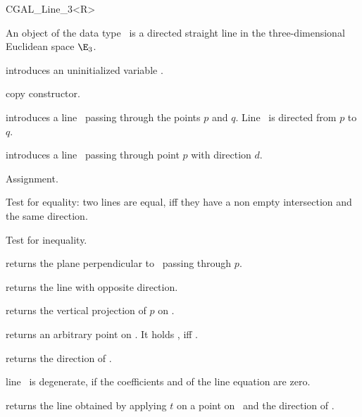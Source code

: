 
\begin {classtemplate} {CGAL_Line_3<R>}

An object  of the data type \classname\ is a directed
straight line in the three-dimensional Euclidean space $\E_3$.

\creation
{}


\hidden {}
             {introduces an uninitialized variable \var.}

\hidden {}
 	    {copy constructor.}

            {introduces a line \var\ passing through the points $p$ and $q$. 
             Line \var\ is directed from $p$ to $q$.}


            {introduces a line \var\ passing through point $p$ with 
             direction $d$.}

\operations
\threecolumns{5cm}{4cm}

\hidden {}
        {Assignment.}

       {Test for equality: two lines are equal, iff they have a non 
        empty intersection and the same direction.}

       {Test for inequality.}

       {returns the plane perpendicular to \var\ passing through $p$.}

       {returns the line with opposite direction.}

       {returns the vertical projection of $p$ on \var.}

       {returns an arbitrary point on \var. It holds 
        , iff .}

       {returns the direction of \var.}

       {line \var\ is degenerate, if the coefficients  and 
         of the line equation are zero.}


       {}

       {returns the line obtained by applying $t$ on a point on \var\ 
        and the direction of \var.}




\end {classtemplate} 

%
%
%
